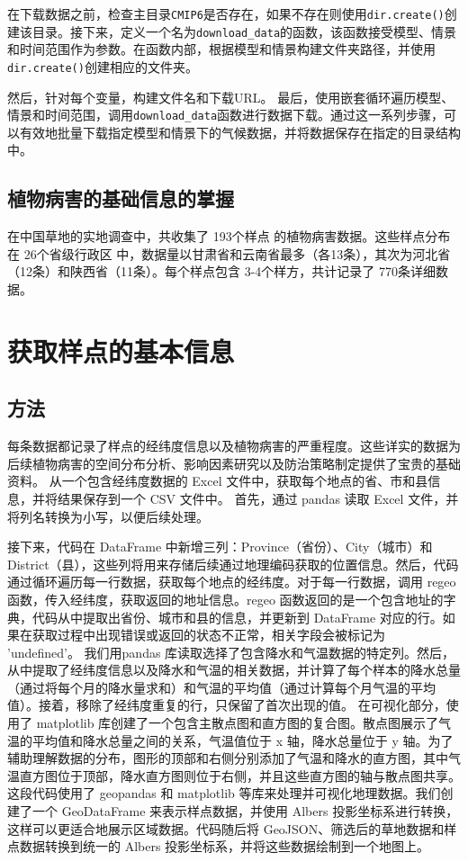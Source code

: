 \documentclass[AutoFakeBold]{LZUThesis-PgD&PhD}
\begin{document}
	在下载数据之前，检查主目录\texttt{CMIP6}是否存在，如果不存在则使用\texttt{dir.create()}创建该目录。接下来，定义一个名为\texttt{download\_data}的函数，该函数接受模型、情景和时间范围作为参数。在函数内部，根据模型和情景构建文件夹路径，并使用\texttt{dir.create()}创建相应的文件夹。
	
	然后，针对每个变量，构建文件名和下载URL。
	最后，使用嵌套循环遍历模型、情景和时间范围，调用\texttt{download\_data}函数进行数据下载。通过这一系列步骤，可以有效地批量下载指定模型和情景下的气候数据，并将数据保存在指定的目录结构中。
	
	
	\subsection{植物病害的基础信息的掌握}
	在中国草地的实地调查中，共收集了 193个样点 的植物病害数据。这些样点分布在 26个省级行政区 中，数据量以甘肃省和云南省最多（各13条），其次为河北省（12条）和陕西省（11条）。每个样点包含 3-4个样方，共计记录了 770条详细数据。
	
	
	
	\section{获取样点的基本信息}
	
	\subsection{方法}
	每条数据都记录了样点的经纬度信息以及植物病害的严重程度。这些详实的数据为后续植物病害的空间分布分析、影响因素研究以及防治策略制定提供了宝贵的基础资料。
	从一个包含经纬度数据的 Excel 文件中，获取每个地点的省、市和县信息，并将结果保存到一个 CSV 文件中。
	首先，通过 pandas 读取 Excel 文件，并将列名转换为小写，以便后续处理。
	
	接下来，代码在 DataFrame 中新增三列：Province（省份）、City（城市）和 District（县），这些列将用来存储后续通过地理编码获取的位置信息。然后，代码通过循环遍历每一行数据，获取每个地点的经纬度。对于每一行数据，调用 regeo 函数，传入经纬度，获取返回的地址信息。regeo 函数返回的是一个包含地址的字典，代码从中提取出省份、城市和县的信息，并更新到 DataFrame 对应的行。如果在获取过程中出现错误或返回的状态不正常，相关字段会被标记为 'undefined'。
	我们用pandas 库读取选择了包含降水和气温数据的特定列。然后，从中提取了经纬度信息以及降水和气温的相关数据，并计算了每个样本的降水总量（通过将每个月的降水量求和）和气温的平均值（通过计算每个月气温的平均值）。接着，移除了经纬度重复的行，只保留了首次出现的值。
	在可视化部分，使用了 matplotlib 库创建了一个包含主散点图和直方图的复合图。散点图展示了气温的平均值和降水总量之间的关系，气温值位于 x 轴，降水总量位于 y 轴。为了辅助理解数据的分布，图形的顶部和右侧分别添加了气温和降水的直方图，其中气温直方图位于顶部，降水直方图则位于右侧，并且这些直方图的轴与散点图共享。
	这段代码使用了 geopandas 和 matplotlib 等库来处理并可视化地理数据。我们创建了一个 GeoDataFrame 来表示样点数据，并使用 Albers 投影坐标系进行转换，这样可以更适合地展示区域数据。代码随后将 GeoJSON、筛选后的草地数据和样点数据转换到统一的 Albers 投影坐标系，并将这些数据绘制到一个地图上。
	
\end{document}
